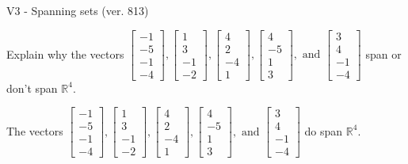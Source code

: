 \begin{exercise}
  \begin{exerciseTitle}V3 - Spanning sets (ver. 813)\end{exerciseTitle}
  \begin{exerciseStatement}
    Explain why the vectors \(\left[\begin{array}{r}
-1 \\
-5 \\
-1 \\
-4
\end{array}\right] , \left[\begin{array}{r}
1 \\
3 \\
-1 \\
-2
\end{array}\right] , \left[\begin{array}{r}
4 \\
2 \\
-4 \\
1
\end{array}\right] , \left[\begin{array}{r}
4 \\
-5 \\
1 \\
3
\end{array}\right] , \text{ and } \left[\begin{array}{r}
3 \\
4 \\
-1 \\
-4
\end{array}\right]\) span or don't span \(\mathbb{R}^4\). 
	


  \end{exerciseStatement}
  \begin{exerciseAnswer}
   The vectors \(\left[\begin{array}{r}
-1 \\
-5 \\
-1 \\
-4
\end{array}\right] , \left[\begin{array}{r}
1 \\
3 \\
-1 \\
-2
\end{array}\right] , \left[\begin{array}{r}
4 \\
2 \\
-4 \\
1
\end{array}\right] , \left[\begin{array}{r}
4 \\
-5 \\
1 \\
3
\end{array}\right] , \text{ and } \left[\begin{array}{r}
3 \\
4 \\
-1 \\
-4
\end{array}\right]\) 
  	 do  
	span \(\mathbb{R}^4\).
  



\end{exerciseAnswer}
\end{exercise}
